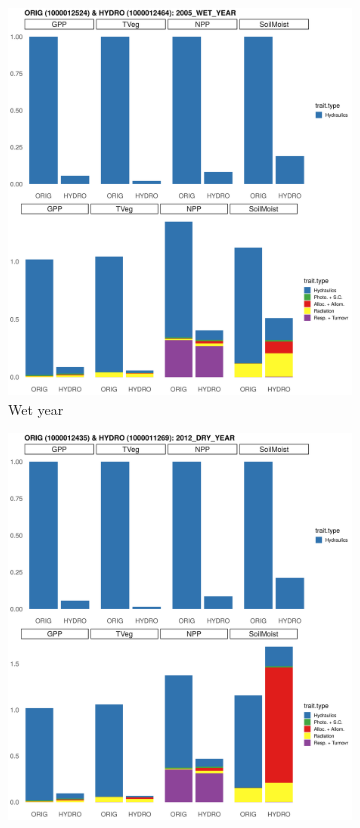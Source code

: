 \begin{figure}[h]
    \centering
    \begin{subfigure}{.5\textwidth}
      \centering
      \includegraphics[width=.95\linewidth]{Hydro_Paper_LaTeX/Hydro_Paper_Figures/barplot_wet_year.png}
      \caption{Wet year}
      \label{fig:barplot_wet}
    \end{subfigure}%
    \begin{subfigure}{.5\textwidth}
      \centering
      \includegraphics[width=.95\linewidth]{Hydro_Paper_LaTeX/Hydro_Paper_Figures/barplot_dry_year.png}

\end{subfigure}
\end{figure}
